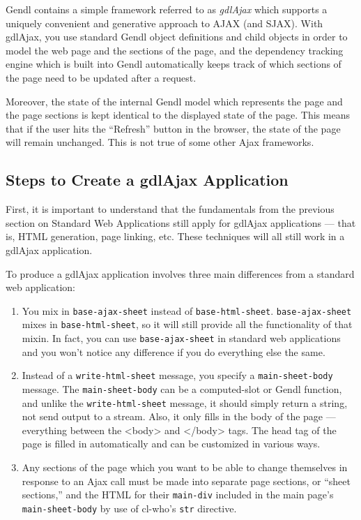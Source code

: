 \documentclass [11pt]{book}
\begin{document}
Gendl contains a simple framework referred to as \emph{gdlAjax} which supports a uniquely convenient and generative
approach to AJAX (and SJAX). With gdlAjax, you use standard Gendl
object definitions and child objects in order to model the web page
and the sections of the page, and the dependency tracking engine which
is built into Gendl automatically keeps track of which sections of the
page need to be updated after a request.



Moreover, the state of the internal Gendl model which represents the
page and the page sections is kept identical to the displayed state of
the page. This means that if the user hits the ``Refresh'' button in
the browser, the state of the page will remain unchanged. This is not
true of some other Ajax frameworks.



\subsection{Steps to Create a gdlAjax Application}

\label{subsec:stepstocreateagdlajaxapplication}



First, it is important to understand that the fundamentals from the
previous section on Standard Web Applications still apply for gdlAjax
applications --- that is, HTML generation, page linking, etc. These
techniques will all still work in a gdlAjax application.



To produce a gdlAjax application involves three main differences from
a standard web application:

\begin{enumerate}

\item You mix in \texttt{base-ajax-sheet} instead of \texttt{base-html-sheet}. \texttt{base-ajax-sheet} mixes in \texttt{base-html-sheet}, so it will still provide all the functionality of that
   mixin. In fact, you can use \texttt{base-ajax-sheet} in standard web applications and you won't notice any difference if you do
    everything else the same.

\item Instead of a \texttt{write-html-sheet} message, you specify a \texttt{main-sheet-body} message. The \texttt{main-sheet-body}  can be a computed-slot or Gendl function,
    and unlike the \texttt{write-html-sheet} message, it should
    simply return a string, not send output to a stream. Also, it only
    fills in the body of the page --- everything between the <body>
    and </body> tags. The head tag of the page is filled in
    automatically and can be customized in various ways.

\item Any sections of the page which you want to be able
      to change themselves in response to an Ajax call must be made
      into separate page sections, or ``sheet sections,'' and the HTML
      for their \texttt{main-div} included in the main page's \texttt{main-sheet-body} by use of cl-who's \texttt{str} directive.

\end{enumerate}
\end{document}
